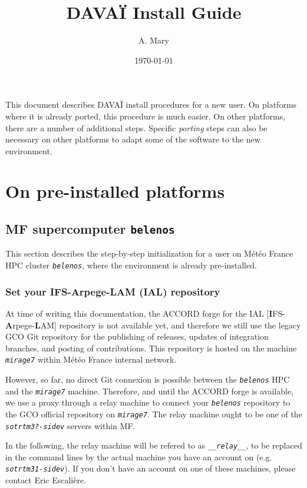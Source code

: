 \documentclass[a4paper,10pt,twoside]{article}
\title{DAVAÏ Install Guide}
\author{A. Mary}
\date{\today}
\begin{document}
\maketitle

This document describes DAVAÏ install procedures for a new user. On platforms where it is already ported, this procedure is much easier. On other platforms, there are a number of additional steps. 
Specific \textit{porting} steps can also be necessary on other platforms to adapt some of the software to the new environment.

\tableofcontents
\vspace{1cm}
\newpage






\section{On pre-installed platforms}

\subsection{MF supercomputer \texttt{belenos}}
This section describes the step-by-step initialization for a user on Météo France HPC cluster \texttt{\textit{belenos}}, where the environment is already pre-installed.

\subsubsection{Set your IFS-Arpege-LAM (IAL) repository}
At time of writing this documentation, the ACCORD forge for the IAL [\textbf{I}FS-\textbf{A}rpege-\textbf{L}AM] repository is not available yet, and therefore we still use the legacy GCO Git repository for the publishing of releases, updates of integration branches, and posting of contributions.
This repository is hosted on the machine \textit{\texttt{mirage7}} within Météo France internal network.

However, so far, no direct Git connexion is possible between the \textit{\texttt{belenos}} HPC and the \textit{\texttt{mirage7}} machine.
Therefore, and until the ACCORD forge is available, we use a proxy through a relay machine to connect your \textit{\texttt{belenos}} repository to the GCO official repository on \textit{\texttt{mirage7}}.
The relay machine ought to be one of the \texttt{\textit{sotrtm3?-sidev}} servers within MF.

In the following, the relay machine will be refered to as \texttt{\textit{\_\_relay\_\_}}, to be replaced in the command lines by the actual machine you have an account on (e.g. \textit{\texttt{sotrtm31-sidev}}). If you don't have an account on one of these machines, please contact Eric Escalière.\\
\end{document}
